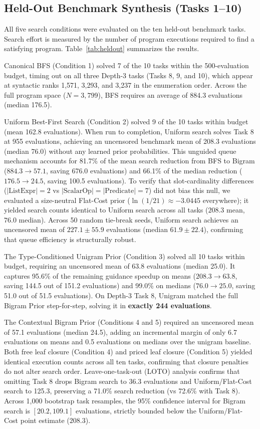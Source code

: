 \documentclass[10pt,twocolumn]{article}
\begin{document}
\raggedbottom

\subsection{Held-Out Benchmark Synthesis (Tasks 1--10)}
All five search conditions were evaluated on the ten held-out benchmark tasks. Search effort is measured by the number of program executions required to find a satisfying program. Table~\ref{tab:heldout} summarizes the results.

Canonical BFS (Condition 1) solved 7 of the 10 tasks within the 500-evaluation budget, timing out on all three Depth-3 tasks (Tasks 8, 9, and 10), which appear at syntactic ranks 1,571, 3,293, and 3,237 in the enumeration order. Across the full program space ($N = 3,799$), BFS requires an average of 884.3 evaluations (median 176.5).

Uniform Best-First Search (Condition 2) solved 9 of the 10 tasks within budget (mean 162.8 evaluations). When run to completion, Uniform search solves Task 8 at 955 evaluations, achieving an uncensored benchmark mean of 208.3 evaluations (median 76.0) without any learned prior probabilities. This unguided queue mechanism accounts for 81.7\% of the mean search reduction from BFS to Bigram ($884.3 \to 57.1$, saving 676.0 evaluations) and 66.1\% of the median reduction ($176.5 \to 24.5$, saving 100.5 evaluations). To verify that slot-cardinality differences ($|\text{ListExpr}|=2$ vs $|\text{ScalarOp}|=|\text{Predicate}|=7$) did not bias this null, we evaluated a size-neutral Flat-Cost prior ($\ln(1/21) \approx -3.0445$ everywhere); it yielded search counts identical to Uniform search across all tasks ($208.3$ mean, $76.0$ median). Across 50 random tie-break seeds, Uniform search achieves an uncensored mean of $227.1 \pm 55.9$ evaluations (median $61.9 \pm 22.4$), confirming that queue efficiency is structurally robust.

The Type-Conditioned Unigram Prior (Condition 3) solved all 10 tasks within budget, requiring an uncensored mean of 63.8 evaluations (median 25.0). It captures 95.6\% of the remaining guidance speedup on means ($208.3 \to 63.8$, saving 144.5 out of 151.2 evaluations) and 99.0\% on medians ($76.0 \to 25.0$, saving 51.0 out of 51.5 evaluations). On Depth-3 Task 8, Unigram matched the full Bigram Prior step-for-step, solving it in \textbf{exactly 244 evaluations}.

The Contextual Bigram Prior (Conditions 4 and 5) required an uncensored mean of 57.1 evaluations (median 24.5), adding an incremental margin of only 6.7 evaluations on means and 0.5 evaluations on medians over the unigram baseline. Both free leaf closure (Condition 4) and priced leaf closure (Condition 5) yielded identical execution counts across all ten tasks, confirming that closure penalties do not alter search order. Leave-one-task-out (LOTO) analysis confirms that omitting Task 8 drops Bigram search to 36.3 evaluations and Uniform/Flat-Cost search to 125.3, preserving a 71.0\% search reduction (vs 72.6\% with Task 8). Across 1,000 bootstrap task resamples, the 95\% confidence interval for Bigram search is $[20.2, 109.1]$ evaluations, strictly bounded below the Uniform/Flat-Cost point estimate ($208.3$).
\end{document}
